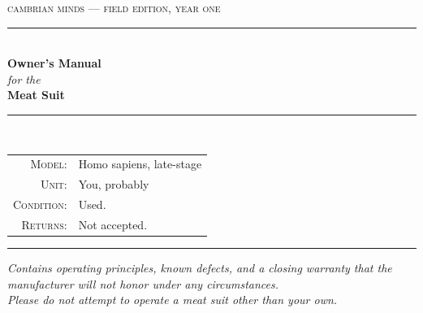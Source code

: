 \documentclass[11pt, letterpaper]{article}
\begin{document}
\thispagestyle{empty}

\begin{center}
\vspace*{0.3in}

{\fontsize{9}{11}\selectfont\textcolor{coldgray}{\textsc{cambrian minds --- field edition, year one}}}\\[1.5em]

\textcolor{coldgray}{\rule{0.5\textwidth}{0.4pt}}\\[1.5em]

{\fontsize{34}{38}\selectfont\bfseries\color{nearblack} Owner's Manual}\\[0.8em]
{\fontsize{14}{16}\selectfont\color{slategray}\textit{for the}}\\[0.4em]
{\fontsize{30}{34}\selectfont\bfseries\color{meatred} Meat Suit}\\[0.4em]

\textcolor{coldgray}{\rule{0.5\textwidth}{0.4pt}}\\[1.5em]

\begin{minipage}{0.75\textwidth}
\centering\small
\begin{tabular}{@{} r l @{}}
\textsc{Model:} & Homo sapiens, late-stage \\
\textsc{Unit:} & You, probably \\
\textsc{Condition:} & Used. \\
\textsc{Returns:} & Not accepted. \\
\end{tabular}
\end{minipage}

\vspace{2em}
\textcolor{coldgray}{\rule{0.3\textwidth}{0.4pt}}

\vspace{1.5em}
\begin{minipage}{0.78\textwidth}
\centering\itshape\small\color{slategray}
Contains operating principles, known defects, and a closing warranty that the manufacturer will not honor under any circumstances.\\[0.5em]
Please do not attempt to operate a meat suit other than your own.
\end{minipage}
\end{center}

\newpage
\end{document}
